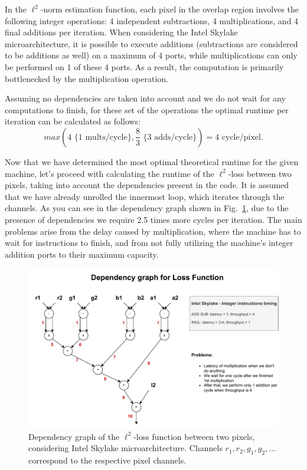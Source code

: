 \documentclass[letterpaper]{article}
\begin{document}
In the $\ell^2$-norm estimation function, each pixel in the overlap region involves the following integer operations: 4 independent subtractions, 4 multiplications, and 4 final additions per iteration. When considering the Intel Skylake microarchitecture, it is possible to execute additions (subtractions are considered to be additions as well) on a maximum of 4 ports, while multiplications can only be performed on 1 of these 4 ports. As a result, the computation is primarily bottlenecked by the multiplication operation.

Assuming no dependencies are taken into account and we do not wait for any computations to finish, for these set of the operations the optimal runtime per iteration can be calculated as follows:
\[ max(4 \text{ \{1 mults/cycle\}}, \frac{8}{3} \text{ \{3 adds/cycle\}}) = 4 \text{ cycle/pixel}. \]

Now that we have determined the most optimal theoretical runtime for the given machine, let's proceed with calculating the runtime of the $\ell^2$-loss between two pixels, taking into account the dependencies present in the code. It is assumed that we have already unrolled the innermost loop, which iterates through the channels. As you can see in the dependency graph shown in Fig.~\ref{dg}, due to the presence of dependencies we require 2.5 times more cycles per iteration. The main problems arise from the delay caused by multiplication, where the machine has to wait for instructions to finish, and from not fully utilizing the machine's integer addition ports to their maximum capacity.

\begin{figure}[htbp]
\centering
  \includegraphics[scale=0.4]{DependencyGraph.pdf}
  \caption{Dependency graph of the $\ell^2$-loss function between two pixels, considering Intel Skylake microarchitecture. Channels {$r_{1}, r_{2}, g_{1}, g_{2}, ...$} correspond to the respective pixel channels.\label{dg}}
\end{figure}
\end{document}
